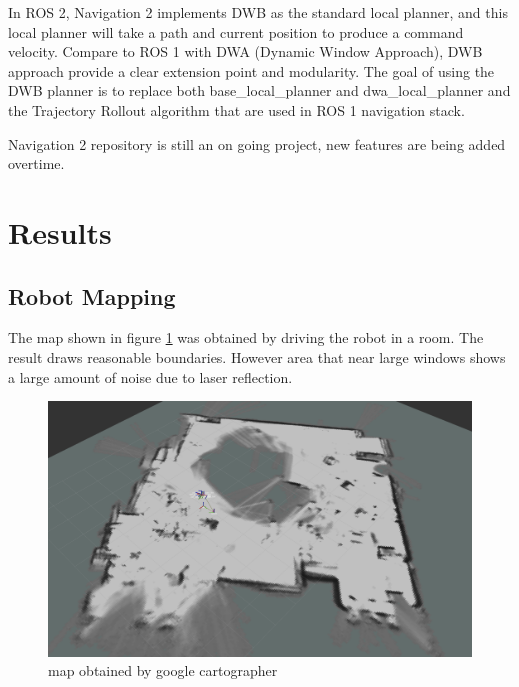 \documentclass[letterpaper, 10 pt, conference]{ieeeconf}  %
\begin{document}
In ROS 2, Navigation 2 implements DWB as the standard local planner, and this local planner will take a path and current position to produce a command velocity\cite{c9}. Compare to ROS 1 with DWA (Dynamic Window Approach), DWB approach provide a clear extension point and modularity. The goal of using the DWB planner is to replace both base\_local\_planner and dwa\_local\_planner and the Trajectory Rollout algorithm that are used in ROS 1 navigation stack. 

Navigation 2 repository is still an on going project, new features are being added overtime. \par\vspace{8pt} 
\section{Results}\label{results}
\subsection{Robot Mapping}
The map shown in figure \ref{fig:map} was obtained by driving the robot in a room. The result draws reasonable boundaries. However area that near large windows shows a large amount of noise due to laser reflection. 
\begin{figure}[!pht]
  \includegraphics[width=\linewidth]{map.png}
  \caption{map obtained by google cartographer} 
  \label{fig:map}
\end{figure}
\end{document}
